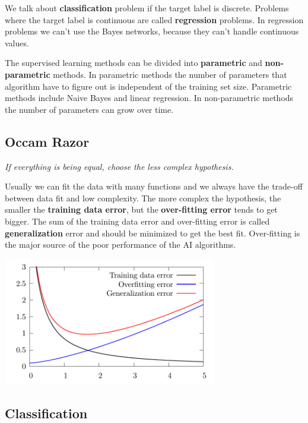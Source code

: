 \documentclass[a4paper,10pt]{article}
\begin{document}
We talk about \textbf{classification} problem if the target label is discrete. Problems where the target label is continuous are called \textbf{regression} problems. In regression problems we can't use the Bayes networks, because they can't handle continuous values.

The supervised learning methods can be divided into \textbf{parametric} and \textbf{non-parametric} methods. In parametric methods the number of parameters that algorithm have to figure out is independent of the training set size. Parametric methods include Naive Bayes and linear regression. In non-parametric methods the number of parameters can grow over time.

\subsection{Occam Razor}
\begin{center}\textit{If everything is being equal, choose the less complex hypothesis.}\end{center}
Usually we can fit the data with many functions and we always have the trade-off between data fit and low complexity. The more complex the hypothesis, the smaller the \textbf{training data error}, but the \textbf{over-fitting error} tends to get bigger. The sum of the training data error and over-fitting error is called \textbf{generalization} error and should be minimized to get the best fit. Over-fitting is the major source of the poor performance of the AI algorithms. 
\vspace{1em}

\begin{center}
\includegraphics[width=0.7\textwidth]{OccamRazor.pdf}
\end{center}

\subsection{Classification}
\end{document}
